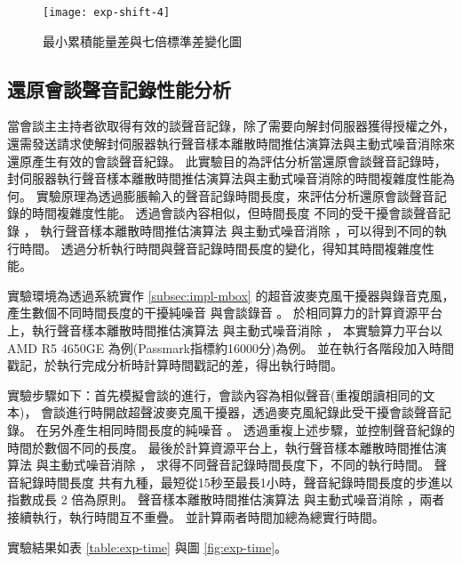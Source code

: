 \begin{figure}[H]
    \centering
    \texttt{[image: exp-shift-4]}
    \caption{最小累積能量差與七倍標準差變化圖}\label{fig:exp-shift-4}
\end{figure}


\subsection{還原會談聲音記錄性能分析}

    當會談主主持者欲取得有效的談聲音記錄，除了需要向解封伺服器獲得授權之外，
還需發送請求使解封伺服器執行聲音樣本離散時間推估演算法與主動式噪音消除來還原產生有效的會談聲音紀錄。
此實驗目的為評估分析當還原會談聲音記錄時，封伺服器執行聲音樣本離散時間推估演算法與主動式噪音消除的時間複雜度性能為何。
實驗原理為透過膨脹輸入的聲音記錄時間長度，來評估分析還原會談聲音記錄的時間複雜度性能。
透過會談內容相似，但時間長度 \DEFtimeREC 不同的受干擾會談聲音記錄 \DEFrecJ，
執行聲音樣本離散時間推估演算法 \DEFfuncEstm{} 與主動式噪音消除 \DEFfuncAnc{}，可以得到不同的執行時間。
透過分析執行時間與聲音記錄時間長度的變化，得知其時間複雜度性能。

    實驗環境為透過系統實作 \ref{subsec:impl-mbox} 的超音波麥克風干擾器與錄音克風，
產生數個不同時間長度的干擾純噪音 \DEFrecN 與會談錄音 \DEFrecJ。
於相同算力的計算資源平台上，執行聲音樣本離散時間推估演算法 \DEFfuncEstm{} 與主動式噪音消除 \DEFfuncAnc{}，
本實驗算力平台以 AMD R5 4650GE 為例(Passmark指標約16000分)為例。
並在執行各階段加入時間戳記，於執行完成分析時計算時間戳記的差，得出執行時間。

    實驗步驟如下：首先模擬會談的進行，會談內容為相似聲音(重複朗讀相同的文本)，
會談進行時開啟超聲波麥克風干擾器，透過麥克風紀錄此受干擾會談聲音記錄。
在另外產生相同時間長度的純噪音 \DEFrecN。
透過重複上述步驟，並控制聲音紀錄的時間於數個不同的長度。
最後於計算資源平台上，執行聲音樣本離散時間推估演算法 \DEFfuncEstm{} 與主動式噪音消除 \DEFfuncAnc{}，
求得不同聲音記錄時間長度下，不同的執行時間。
聲音紀錄時間長度 \DEFtimeREC 共有九種，最短從15秒至最長1小時，聲音紀錄時間長度的步進以指數成長 2 倍為原則。
聲音樣本離散時間推估演算法 \DEFfuncEstm{} 與主動式噪音消除 \DEFfuncAnc{}，兩者接續執行，執行時間互不重疊。
並計算兩者時間加總為總實行時間。

    實驗結果如表 \ref{table:exp-time} 與圖 \ref{fig:exp-time}。


